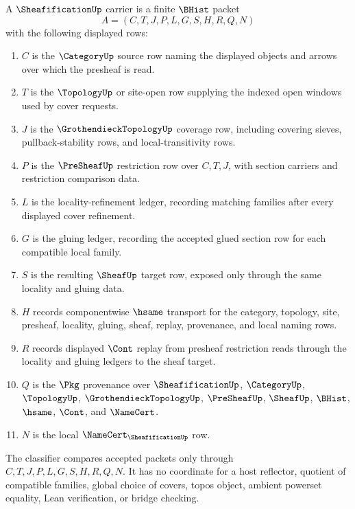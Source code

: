 \begin{definition}
\label{def:sheafification-carrier}
A $\SheafificationUp$ carrier is a finite $\BHist$ packet
$$
A=(C,T,J,P,L,G,S,H,R,Q,N)
$$
with the following displayed rows:
\begin{enumerate}
\item $C$ is the $\CategoryUp$ source row naming the displayed objects and arrows over which the presheaf is read.
\item $T$ is the $\TopologyUp$ or site-open row supplying the indexed open windows used by cover requests.
\item $J$ is the $\GrothendieckTopologyUp$ coverage row, including covering sieves, pullback-stability rows, and local-transitivity rows.
\item $P$ is the $\PreSheafUp$ restriction row over $C,T,J$, with section carriers and restriction comparison data.
\item $L$ is the locality-refinement ledger, recording matching families after every displayed cover refinement.
\item $G$ is the gluing ledger, recording the accepted glued section row for each compatible local family.
\item $S$ is the resulting $\SheafUp$ target row, exposed only through the same locality and gluing data.
\item $H$ records componentwise $\hsame$ transport for the category, topology, site, presheaf, locality, gluing, sheaf, replay, provenance, and local naming rows.
\item $R$ records displayed $\Cont$ replay from presheaf restriction reads through the locality and gluing ledgers to the sheaf target.
\item $Q$ is the $\Pkg$ provenance over $\SheafificationUp$, $\CategoryUp$, $\TopologyUp$, $\GrothendieckTopologyUp$, $\PreSheafUp$, $\SheafUp$, $\BHist$, $\hsame$, $\Cont$, and $\NameCert$.
\item $N$ is the local $\NameCert_{\SheafificationUp}$ row.
\end{enumerate}
The classifier compares accepted packets only through $C,T,J,P,L,G,S,H,R,Q,N$. It has no coordinate for a host reflector, quotient of compatible families, global choice of covers, topos object, ambient powerset equality, Lean verification, or bridge checking.
\end{definition}

